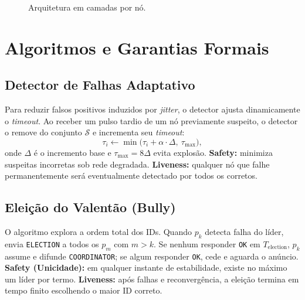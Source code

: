 \documentclass[conference]{IEEEtran}
\begin{document}
\begin{figure}[!t]
\centering
\footnotesize
{}
\caption{Arquitetura em camadas por nó.}
\label{fig:arch}
\end{figure}

\section{Algoritmos e Garantias Formais}

\subsection{Detector de Falhas Adaptativo}
Para reduzir falsos positivos induzidos por \textit{jitter}, o detector ajusta dinamicamente o \textit{timeout}. Ao receber um pulso tardio de um nó previamente suspeito, o detector o remove do conjunto $\mathcal{S}$ e incrementa seu \textit{timeout}:
\begin{equation}
\tau_i \leftarrow \min\!\bigl(\tau_i + \alpha\cdot\Delta,\ \tau_{\max}\bigr),
\end{equation}
onde $\Delta$ é o incremento base e $\tau_{\max}=8\Delta$ evita explosão. \textbf{Safety:} minimiza suspeitas incorretas sob rede degradada. \textbf{Liveness:} qualquer nó que falhe permanentemente será eventualmente detectado por todos os corretos.

\subsection{Eleição do Valentão (Bully)}
O algoritmo explora a ordem total dos IDs. Quando $p_k$ detecta falha do líder, envia \texttt{ELECTION} a todos os $p_m$ com $m>k$. Se nenhum responder \texttt{OK} em $T_{\text{election}}$, $p_k$ assume e difunde \texttt{COORDINATOR}; se algum responder \texttt{OK}, cede e aguarda o anúncio. \textbf{Safety (Unicidade):} em qualquer instante de estabilidade, existe no máximo um líder por termo. \textbf{Liveness:} após falhas e reconvergência, a eleição termina em tempo finito escolhendo o maior ID correto.
\end{document}
